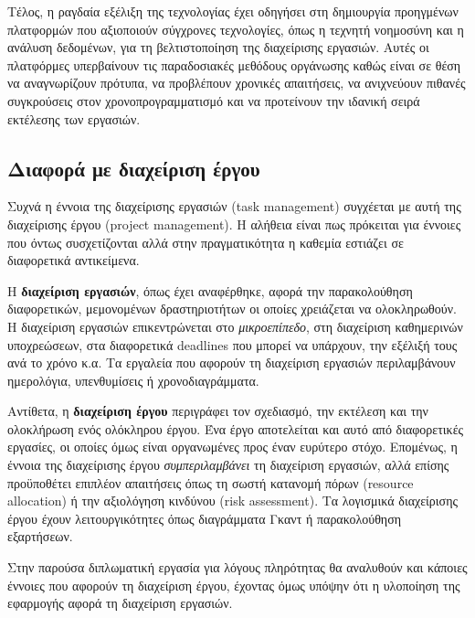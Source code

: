             Τέλος, η ραγδαία εξέλιξη της τεχνολογίας έχει οδηγήσει στη δημιουργία προηγμένων πλατφορμών που αξιοποιούν σύγχρονες τεχνολογίες, όπως η τεχνητή νοημοσύνη και η ανάλυση δεδομένων, για τη βελτιστοποίηση της διαχείρισης εργασιών. Αυτές οι πλατφόρμες υπερβαίνουν τις παραδοσιακές μεθόδους οργάνωσης καθώς είναι σε θέση να αναγνωρίζουν πρότυπα, να προβλέπουν χρονικές απαιτήσεις, να ανιχνεύουν πιθανές συγκρούσεις στον χρονοπρογραμματισμό και να προτείνουν την ιδανική σειρά εκτέλεσης των εργασιών.

        \subsection{Διαφορά με διαχείριση έργου}
            Συχνά η έννοια της διαχείρισης εργασιών (task management) συγχέεται με αυτή της διαχείρισης έργου (project management). Η αλήθεια είναι πως πρόκειται για έννοιες που όντως συσχετίζονται αλλά στην πραγματικότητα η καθεμία εστιάζει σε διαφορετικά αντικείμενα.

            Η \textbf{διαχείριση εργασιών}, όπως έχει αναφέρθηκε, αφορά την παρακολούθηση διαφορετικών, μεμονομένων δραστηριοτήτων οι οποίες χρειάζεται να ολοκληρωθούν. Η διαχείριση εργασιών επικεντρώνεται στο \textit{μικροεπίπεδο}, στη διαχείριση καθημερινών υποχρεώσεων, στα διαφορετικά deadlines που μπορεί να υπάρχουν, την εξέλιξή τους ανά το χρόνο κ.α. Τα εργαλεία που αφορούν τη διαχείριση εργασιών περιλαμβάνουν ημερολόγια, υπενθυμίσεις ή χρονοδιαγράμματα.

            Αντίθετα, η \textbf{διαχείριση έργου} περιγράφει τον σχεδιασμό, την εκτέλεση και την ολοκλήρωση ενός ολόκληρου έργου. Ένα έργο αποτελείται και αυτό από διαφορετικές εργασίες, οι οποίες όμως είναι οργανωμένες προς έναν ευρύτερο στόχο. Επομένως, η έννοια της διαχείρισης έργου \textit{συμπεριλαμβάνει} τη διαχείριση εργασιών, αλλά επίσης προϋποθέτει επιπλέον απαιτήσεις όπως τη σωστή κατανομή πόρων (resource allocation) ή την αξιολόγηση κινδύνου (risk assessment). Τα λογισμικά διαχείρισης έργου έχουν λειτουργικότητες όπως διαγράμματα Γκαντ ή παρακολούθηση εξαρτήσεων.

            Στην παρούσα διπλωματική εργασία για λόγους πληρότητας θα αναλυθούν και κάποιες έννοιες που αφορούν τη διαχείριση έργου, έχοντας όμως υπόψην ότι η υλοποίηση της εφαρμογής αφορά τη διαχείριση εργασιών.


